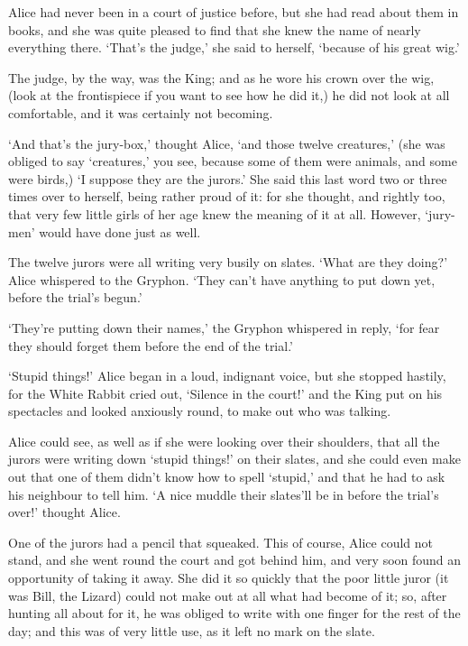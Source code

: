 \documentclass[statementpaper,twoside,openany]{memoir}
\begin{document}
Alice had never been in a court of justice before, but she had read about them in books, and she was quite pleased to find that she knew the name of nearly everything there. `That's the judge,' she said to herself, `because of his great wig.'

The judge, by the way, was the King; and as he wore his crown over the wig, (look at the frontispiece if you want to see how he did it,) he did not look at all comfortable, and it was certainly not becoming.

`And that's the jury-box,' thought Alice, `and those twelve creatures,' (she was obliged to say `creatures,' you see, because some of them were animals, and some were birds,) `I suppose they are the jurors.' She said this last word two or three times over to herself, being rather proud of it: for she thought, and rightly too, that very few little girls of her age knew the meaning of it at all. However, `jury-men' would have done just as well.

The twelve jurors were all writing very busily on slates. `What are they doing?' Alice whispered to the Gryphon. `They can't have anything to put down yet, before the trial's begun.'

`They're putting down their names,' the Gryphon whispered in reply, `for fear they should forget them before the end of the trial.'

`Stupid things!' Alice began in a loud, indignant voice, but she stopped hastily, for the White Rabbit cried out, `Silence in the court!' and the King put on his spectacles and looked anxiously round, to make out who was talking.

Alice could see, as well as if she were looking over their shoulders, that all the jurors were writing down `stupid things!' on their slates, and she could even make out that one of them didn't know how to spell `stupid,' and that he had to ask his neighbour to tell him. `A nice muddle their slates'll be in before the trial's over!' thought Alice.

One of the jurors had a pencil that squeaked. This of course, Alice could not stand, and she went round the court and got behind him, and very soon found an opportunity of taking it away. She did it so quickly that the poor little juror (it was Bill, the Lizard) could not make out at all what had become of it; so, after hunting all about for it, he was obliged to write with one finger for the rest of the day; and this was of very little use, as it left no mark on the slate.
\end{document}
